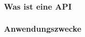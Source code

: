\subsubsection{Was ist eine API}
  \label{Was ist eine API}
  
\pagebreak

\subsubsection{Anwendungszwecke}
  \label{Anwendungszwecke}
  
\pagebreak